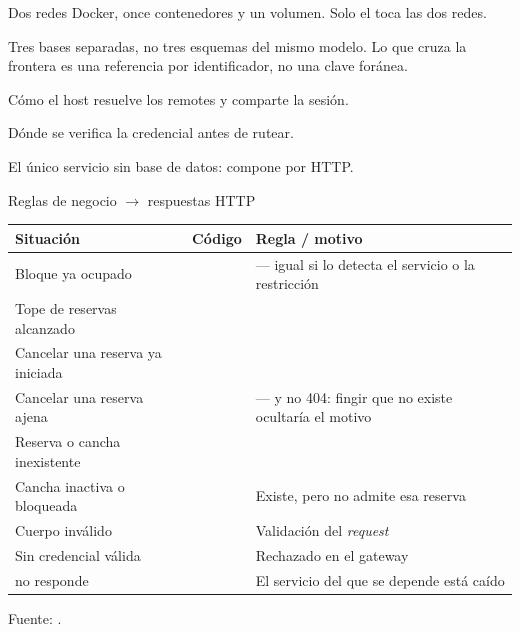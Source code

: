 %
  {Dos redes Docker, once contenedores y un volumen. Solo el  toca
   las dos redes.}

%
  {Tres bases separadas, no tres esquemas del mismo modelo. Lo que cruza la
   frontera es una referencia por identificador, no una clave foránea.}

%
  {Cómo el host resuelve los remotes y comparte la sesión.}

%
  {Dónde se verifica la credencial antes de rutear.}



%
  {El único servicio sin base de datos: compone por HTTP.}

\begin{frame}{Reglas de negocio $\rightarrow$ respuestas HTTP}

  \begin{center}
    \scriptsize
    \setlength{\tabcolsep}{4pt}
    \renewcommand{\arraystretch}{1.05}
    \begin{tabular}{@{}llL{5.8cm}@{}}
      \toprule
      \textbf{Situación} & \textbf{Código} & \textbf{Regla / motivo}\\
      \midrule
      Bloque ya ocupado             &  &  — igual si lo detecta el servicio o la restricción \\
      Tope de reservas alcanzado    &  & \\
      Cancelar una reserva ya iniciada &  & \\
      Cancelar una reserva ajena    &  &  — y no 404: fingir que no existe ocultaría el motivo\\
      Reserva o cancha inexistente  &  & \\
      Cancha inactiva o bloqueada   &  & Existe, pero no admite esa reserva\\
      Cuerpo inválido               &  & Validación del \emph{request}\\
      Sin credencial válida         &  & Rechazado en el gateway\\
       no responde   &  & El servicio del que se depende está caído\\
      \bottomrule
    \end{tabular}
  \end{center}
  {\tiny\color{textoSuave} Fuente:
  .}
\end{frame}

